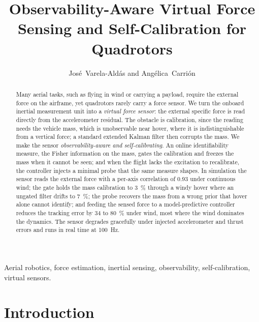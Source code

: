 \documentclass[lettersize,journal]{IEEEtran}
\begin{document}
\title{Observability-Aware Virtual Force Sensing and
Self-Calibration for Quadrotors}

\author{Jos\'e~Varela-Ald\'as and Ang\'elica~Carri\'on}

\maketitle

\begin{abstract}
Many aerial tasks, such as flying in wind or carrying a payload, require the
external force on the airframe, yet quadrotors rarely carry a force sensor. We turn
the onboard inertial measurement unit into a \emph{virtual force sensor}: the
external specific force is read directly from the accelerometer residual. The
obstacle is calibration, since the reading needs the vehicle mass, which is
unobservable near hover, where it is indistinguishable from a vertical force; a
standard extended Kalman filter then corrupts the mass. We make the sensor
\emph{observability-aware and self-calibrating}. An online identifiability
measure, the Fisher information on the mass, gates the calibration and freezes
the mass when it cannot be seen; and when the flight lacks the excitation to
recalibrate, the controller injects a minimal probe that the same measure
shapes. In simulation the sensor reads the external force with a per-axis
correlation of \num{0.93} under continuous wind; the gate holds the mass
calibration to \SI{3}{\percent} through a windy hover where an ungated filter
drifts to \SI{7}{\percent}; the probe recovers the mass from a wrong prior that
hover alone cannot identify; and feeding the sensed force to a model-predictive
controller reduces the tracking error by \SI{34}{} to \SI{80}{\percent} under
wind, most where the wind dominates the dynamics. The sensor degrades gracefully
under injected accelerometer and thrust errors and runs in real time at
\SI{100}{\hertz}.
\end{abstract}

\begin{IEEEkeywords}
Aerial robotics, force estimation, inertial sensing, observability,
self-calibration, virtual sensors.
\end{IEEEkeywords}

\section{Introduction}\label{sec:intro}
\end{document}
